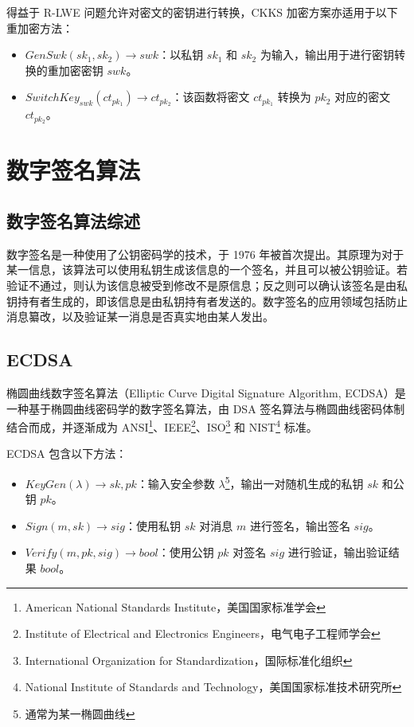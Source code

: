 得益于 R-LWE 问题允许对密文的密钥进行转换\cite{brakerski2014leveled}，CKKS 加密方案亦适用于以下重加密方法：

\begin{itemize}
    \item $GenSwk(sk_1, sk_2) \rightarrow swk$：以私钥 $sk_1$ 和 $sk_2$ 为输入，输出用于进行密钥转换的重加密密钥 $swk$。
    \item $SwitchKey_{swk}(ct_{pk_1}) \rightarrow ct_{pk_2}$：该函数将密文 $ct_{pk_1}$ 转换为 $pk_2$ 对应的密文 $ct_{pk_2}$。
\end{itemize}

\section{数字签名算法}

\subsection{数字签名算法综述}

数字签名是一种使用了公钥密码学的技术，于 1976 年被首次提出\cite{1055638}。其原理为对于某一信息，该算法可以使用私钥生成该信息的一个签名，并且可以被公钥验证。若验证不通过，则认为该信息被受到修改不是原信息；反之则可以确认该签名是由私钥持有者生成的，即该信息是由私钥持有者发送的。数字签名的应用领域包括防止消息纂改，以及验证某一消息是否真实地由某人发出。

\subsection{ECDSA}

椭圆曲线数字签名算法（Elliptic Curve Digital Signature Algorithm, ECDSA）是一种基于椭圆曲线密码学的数字签名算法，由 DSA 签名算法与椭圆曲线密码体制结合而成，并逐渐成为 ANSI\footnote{American National Standards Institute，美国国家标准学会}、IEEE\footnote{Institute of Electrical and Electronics Engineers，电气电子工程师学会}、ISO\footnote{International Organization for Standardization，国际标准化组织} 和 NIST\footnote{National Institute of Standards and Technology，美国国家标准技术研究所} 标准\cite{ecdsa_blockchain}。 

ECDSA 包含以下方法：

\begin{itemize}
    \item $KeyGen(\lambda) \rightarrow sk, pk$：输入安全参数 $\lambda$\footnote{通常为某一椭圆曲线}，输出一对随机生成的私钥 $sk$ 和公钥 $pk$。
    \item $Sign(m, sk) \rightarrow sig$：使用私钥 $sk$ 对消息 $m$ 进行签名，输出签名 $sig$。
    \item $Verify(m, pk, sig) \rightarrow bool$：使用公钥 $pk$ 对签名 $sig$ 进行验证，输出验证结果 $bool$。
\end{itemize}

